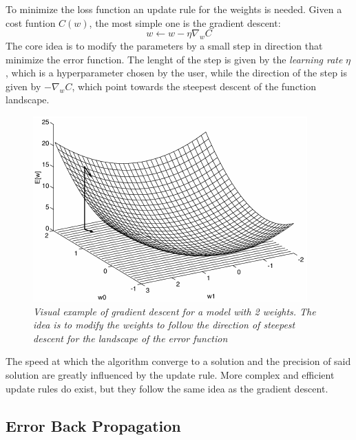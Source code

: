 \documentclass[12pt,a4paper]{report}
\begin{document}
To minimize the loss function an update rule for the weights is needed. 
Given a cost funtion $C(w)$, the most simple one is the gradient descent:
\begin{equation}
 w \leftarrow w - \eta \nabla_w C
\end{equation}
The core idea is to modify the parameters by a small step in direction that minimize the error function. 
The lenght of the step is given by the {\it learning rate} $\eta$, which is a hyperparameter chosen by the user, while the direction of the step is given by $-\nabla_w C$, which point towards the steepest descent of the function landscape.

\begin{figure}[h]
 \centering
 \includegraphics[scale=0.8]{./images/sgd.png}
 \caption{\it Visual example of gradient descent for a model with 2 weights. The idea is to modify the weights to follow the direction of steepest descent for the landscape of the error function}
 \label{fig:gd}
\end{figure}
The speed at which the algorithm converge to a solution and the precision of said solution are greatly influenced by the update rule. More complex and efficient update rules do exist, but they follow the same idea as the gradient descent.

\subsection*{Error Back Propagation}
\end{document}
